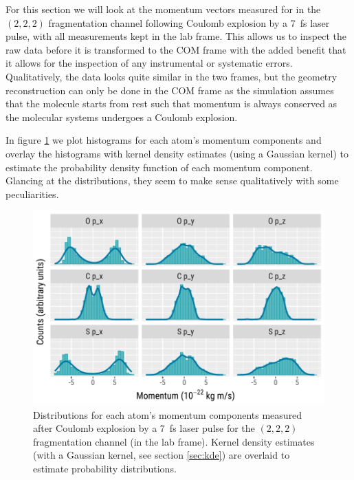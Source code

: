 For this section we will look at the momentum vectors measured for  in the $(2,2,2)$ fragmentation channel following Coulomb explosion by a \SI{7}{\fs} laser pulse, with all measurements kept in the lab frame. This allows us to inspect the raw data before it is transformed to the COM frame with the added benefit that it allows for the inspection of any instrumental or systematic errors. Qualitatively, the data looks quite similar in the two frames, but the geometry reconstruction can only be done in the COM frame as the simulation assumes that the molecule starts from rest such that momentum is always conserved as the molecular systems undergoes a Coulomb explosion.

In figure \ref{fig:OCS2227fsMomentum} we plot histograms for each atom's momentum components and overlay the histograms with kernel density estimates (using a Gaussian kernel) to estimate the probability density function of each momentum component. Glancing at the distributions, they seem to make sense qualitatively with some peculiarities. 

\begin{figure}
  \centering
  \includegraphics[width=\textwidth]{Plots/OCS2227fsMomentum}
  \caption[Distributions for each atom's momentum components measured after Coulomb explosion by a \SI{7}{\fs} laser pulse for the $(2,2,2)$ fragmentation channel (in the lab frame).]
  {Distributions for each atom's momentum components measured after Coulomb explosion by a \SI{7}{\fs} laser pulse for the $(2,2,2)$ fragmentation channel (in the lab frame). Kernel density estimates (with a Gaussian kernel, see section \ref{sec:kde}) are overlaid to estimate probability distributions.}
  \label{fig:OCS2227fsMomentum}
\end{figure}

